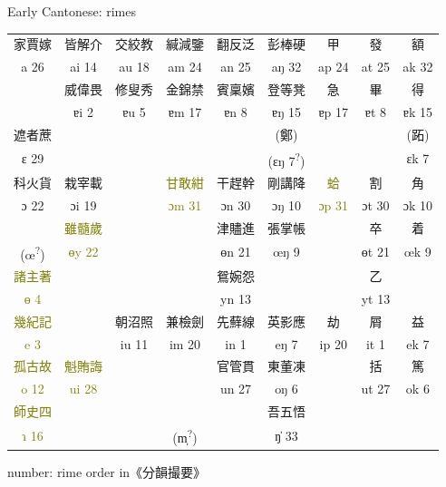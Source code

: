 \documentclass{beamer}
\begin{document}
\begin{frame}[fragile]{Early Cantonese: rimes}

\begin{table}
    \centering
      {\scriptsize
        \setlength{\tabcolsep}{1pt}
        \renewcommand{\arraystretch}{1.1}    \begin{tabular}{c | c | c | c | c | c | c | c | c}
        家賈嫁 & 皆解介 & 交絞教 & 緘減鑒 & 翻反泛 & 彭棒硬 & 甲 & 發 & 額\\
        a 26 & ai 14 & au 18 & am 24 & an 25 & aŋ 32 & ap 24 & at 25 & ak 32\\ \hline
         & 威偉畏 & 修叟秀 & 金錦禁 & 賓稟嬪 & 登等凳 & 急 & 畢 & 得\\
         & ɐi 2 & ɐu 5 & ɐm 17 & ɐn 8 & ɐŋ 15 & ɐp 17 & ɐt 8 & ɐk 15\\ \hline
        遮者蔗 & & & & & (鄭) & & & (跖)\\
        ɛ 29 & & & & & (ɛŋ 7\textsuperscript{?}) & & & ɛk 7\\ \hline
        科火貨 & 栽宰載 & & \textcolor{olive}{甘敢紺} & 干趕幹 & 剛講降 & \textcolor{olive}{蛤} & 割 & 角\\
        ɔ 22 & ɔi 19 & & \textcolor{olive}{ɔm 31} & ɔn 30 & ɔŋ 10 & \textcolor{olive}{ɔp 31} & ɔt 30 & ɔk 10\\ \hline
         & \textcolor{olive}{雖髓歲} & & & 津贐進 & 張掌帳 & & 卒 & 着\\
        (œ\textsuperscript{?}) & \textcolor{olive}{ɵy 22} & & & ɵn 21 & œŋ 9 & & ɵt 21 & œk 9\\ \hline
        \textcolor{olive}{諸主著} & & & & 鴛婉怨 & & & 乙 & \\
        \textcolor{olive}{ɵ 4} & & & & yn 13 & & & yt 13 & \\ \hline
        \textcolor{olive}{幾紀記} & & 朝沼照 & 兼檢劍 & 先蘚線 & 英影應 & 劫 & 屑 & 益\\ 
        \textcolor{olive}{e 3} & & iu 11 & im 20 & in 1 & eŋ 7 & ip 20 & it 1 & ek 7\\ \hline
        \textcolor{olive}{孤古故} & \textcolor{olive}{魁賄誨} & & & 官管貫 & 東董凍 & & 括 & 篤 \\
        \textcolor{olive}{o 12} & \textcolor{olive}{ui 28} & & & un 27 & oŋ 6 & & ut 27 & ok 6 \\ \hline
        \textcolor{olive}{師史四} & & & & & 吾五悟 & & \\
        \textcolor{olive}{ɿ 16} & & & (m̩\textsuperscript{?}) & & ŋ̍ 33 & & & \\
        \end{tabular}}
\end{table}
{\tiny number: rime order in《分韻撮要》}
\end{frame}
\end{document}
